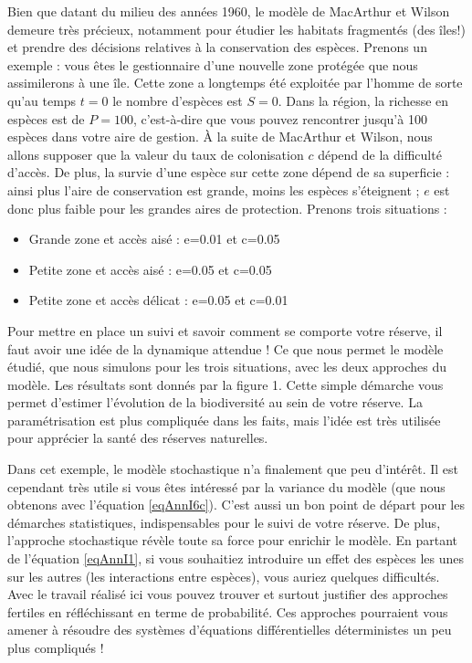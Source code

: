 Bien que datant du milieu des années 1960, le modèle de MacArthur et Wilson demeure très précieux, notamment pour étudier les habitats fragmentés (des îles!) et prendre des décisions relatives à la conservation des espèces. Prenons un exemple : vous êtes le gestionnaire d'une nouvelle zone protégée que nous assimilerons à une île. Cette zone a longtemps été exploitée par l'homme de sorte qu'au temps $t=0$ le nombre d'espèces est $S=0$. Dans la région, la richesse en espèces est de $P=100$, c'est-à-dire que vous pouvez rencontrer jusqu'à 100 espèces dans votre aire de gestion. À la suite de MacArthur et Wilson, nous allons supposer que la valeur du taux de colonisation $c$ dépend de la difficulté d'accès. De plus, la survie d'une espèce sur cette zone dépend de sa superficie : ainsi plus l'aire de conservation est grande, moins les espèces s'éteignent ; $e$ est donc plus faible pour les grandes aires de protection. Prenons trois situations :
\begin{itemize}
\item Grande zone et accès aisé : e=0.01 et c=0.05
\item Petite zone et accès aisé : e=0.05 et c=0.05
\item Petite zone et accès délicat : e=0.05 et c=0.01
\end{itemize}
Pour mettre en place un suivi et savoir comment se comporte votre réserve, il faut avoir une idée de la dynamique attendue ! Ce que nous permet le modèle étudié, que nous simulons pour les trois situations, avec les deux approches du modèle. Les résultats sont donnés par la figure 1. Cette simple démarche vous permet d'estimer l'évolution de la biodiversité au sein de votre réserve. La paramétrisation est plus compliquée dans les faits, mais l'idée est très utilisée pour apprécier la santé des réserves naturelles.


Dans cet exemple, le modèle stochastique n'a finalement que peu d'intérêt. Il est cependant très utile si vous êtes intéressé par la variance du modèle (que nous obtenons avec l'équation \eqref{eqAnnI6c}). C'est aussi un bon point de départ pour les démarches statistiques, indispensables pour le suivi de votre réserve. De plus, l'approche stochastique révèle toute sa force pour enrichir le modèle. En partant de l'équation \eqref{eqAnnI1}, si vous souhaitiez introduire un effet des espèces les unes sur les autres (les interactions entre espèces), vous auriez quelques difficultés. Avec le travail réalisé ici vous pouvez trouver et surtout justifier des approches fertiles en réfléchissant en terme de probabilité. Ces approches pourraient vous amener à résoudre des systèmes d'équations différentielles déterministes un peu plus compliqués !


